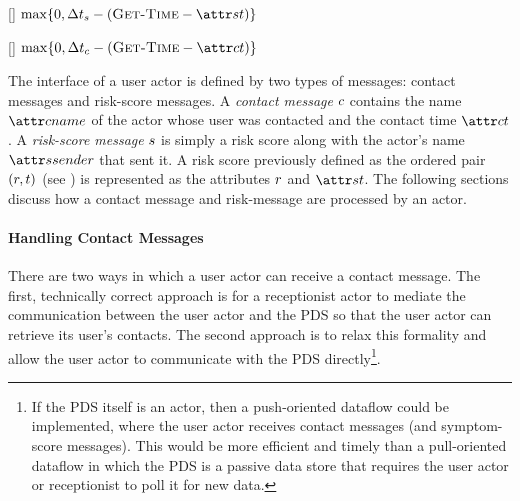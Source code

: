%
\begin{function}{\nScoreTtl}[\vScore]
    \State \Return $\max \{0, \pScoreTtl - (\cGetTime - \aScoreTime)\}$
\end{function}
\begin{function}{\nContactTtl}[\vContact]
    \State \Return $\max \{0, \pContactTtl - (\cGetTime - \aContactTime)\}$
\end{function}
%
The interface of a user actor is defined by two types of messages: contact messages and risk-score messages. A \emph{contact message} $c$ contains the name $\aContactName$ of the actor whose user was contacted and the contact time $\aContactTime$. A \emph{risk-score message} $s$ is simply a risk score along with the actor's name $\aScoreSender$ that sent it. A risk score previously defined as the ordered pair $(r, t)$ (see ) is represented as the attributes $r$ and $\aScoreTime$. The following sections discuss how a contact message and risk-message are processed by an actor.

\paragraph{Handling Contact Messages}\label{sec:contact-message-handling}

There are two ways in which a user actor can receive a contact message. The first, technically correct approach is for a receptionist actor to mediate the communication between the user actor and the PDS so that the user actor can retrieve its user's contacts. The second approach is to relax this formality and allow the user actor to communicate with the PDS directly\footnote{If the PDS itself is an actor, then a push-oriented dataflow could be implemented, where the user actor receives contact messages (and symptom-score messages). This would be more efficient and timely than a pull-oriented dataflow in which the PDS is a passive data store that requires the user actor or receptionist to poll it for new data.}.

